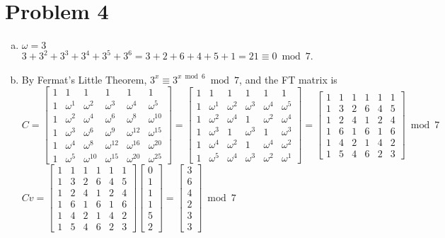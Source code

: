 \documentclass[11pt]{article}
\newcounter{problemnumber}
\begin{document}
\section*{Problem 4}
\begin{enumerate}[(a)]
\item $\omega = 3$ \\ $3+3^2+3^3+3^4+3^5+3^6 = 3+2+6+4+5+1 = 21 \equiv 0 \bmod 7$.
\item By Fermat's Little Theorem, $3^x \equiv 3^{x \bmod 6} \bmod 7$, and the FT matrix is \\
$C=\begin{bmatrix}1&1&1&1&1&1\\1&\omega^1&\omega^2&\omega^3&\omega^4&\omega^5\\1&\omega^2&\omega^4&\omega^6&\omega^8&\omega^{10}\\1&\omega^3&\omega^6&\omega^9&\omega^{12}&\omega^{15}\\1&\omega^4&\omega^8&\omega^{12}&\omega^{16}&\omega^{20}\\1&\omega^5&\omega^{10}&\omega^{15}&\omega^{20}&\omega^{25}\end{bmatrix} = \begin{bmatrix}1&1&1&1&1&1\\1&\omega^1&\omega^2&\omega^3&\omega^4&\omega^5\\1&\omega^2&\omega^4&1&\omega^2&\omega^4\\1&\omega^3&1&\omega^3&1&\omega^3\\1&\omega^4&\omega^2&1&\omega^4&\omega^2\\1&\omega^5&\omega^4&\omega^3&\omega^2&\omega^1\end{bmatrix} = \begin{bmatrix}1&1&1&1&1&1\\1&3&2&6&4&5\\1&2&4&1&2&4\\1&6&1&6&1&6\\1&4&2&1&4&2\\1&5&4&6&2&3\end{bmatrix}\bmod 7$ \\
$Cv=\begin{bmatrix}1&1&1&1&1&1\\1&3&2&6&4&5\\1&2&4&1&2&4\\1&6&1&6&1&6\\1&4&2&1&4&2\\1&5&4&6&2&3\end{bmatrix}\begin{bmatrix}0\\1\\1\\1\\5\\2\end{bmatrix} = \begin{bmatrix}3\\6\\4\\2\\3\\3\end{bmatrix} \bmod 7$

\end{enumerate}
\end{document}
